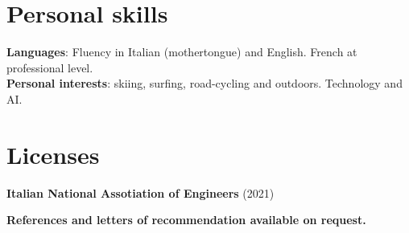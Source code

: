 \documentclass[letterpaper,11pt]{article}
\begin{document}
\section{Personal skills}
\begin{itemize}[leftmargin=0.15in, label={}]
  \small{\item{
                \textbf{Languages}{: Fluency in Italian (mothertongue) and English. French at professional level.} \\
                \textbf{Personal interests}{: skiing, surfing, road-cycling and outdoors. Technology and AI.}\\
          }}
\end{itemize}

\section{Licenses}
\begin{itemize}[leftmargin=0.15in, label={}]
  \small{\item{
                \textbf{Italian National Assotiation of Engineers}{ (2021)} \\}}
\end{itemize}

\centering
\textbf{References and letters of recommendation available on request.}

\end{document}
